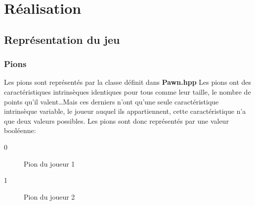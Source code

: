 \documentclass[article, backcover, french, nodocumentinfo]{upmethodology-document}
\begin{document}
	\section{Réalisation}
		\subsection{Représentation du jeu}
			\subsubsection{Pions}
					Les pions sont représentés par la classe  définit dans \textbf{Pawn.hpp}
					Les pions ont des caractéristiques intrinsèques identiques pour tous comme leur taille, le nombre de points qu'il valent\ldots Mais ces derniers n'ont qu'une seule caractéristique intrinsèque variable, le joueur auquel ils appartiennent, cette caractéristique n'a que deux valeurs possibles.
					Les pions sont donc représentés par une valeur booléenne:
					\begin{description}
						\item[0] Pion du joueur 1
						\item[1] Pion du joueur 2
					\end{description}
\end{document}
